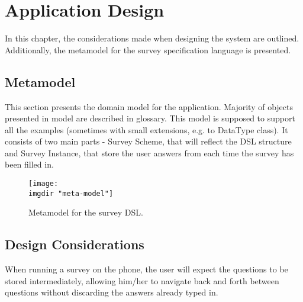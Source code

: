 \chapter{Application Design}
\label{chap:design}
In this chapter, the considerations made when designing the system are outlined. Additionally, the metamodel for the survey specification language is presented.

\section{Metamodel}
\label{sec:metamodel}
This section presents the domain model for the application. Majority of objects presented in model are described in glossary. This model is supposed to support all the examples (sometimes with small extensions, e.g. to DataType class). It consists of two main parts - Survey Scheme, that will reflect the DSL structure and Survey Instance, that store the user answers from each time the survey has been filled in.

\begin{figure}[!htbp]
  \texttt{[image: \\imgdir "meta-model"]}
  \caption{Metamodel for the survey DSL.}
  \label{fig:metamodel}
\end{figure}


\section{Design Considerations}
\label{sec:designconsiderations}
When running a survey on the phone, the user will expect the questions to be stored intermediately, allowing him/her to navigate back and forth between questions without discarding the answers already typed in.

